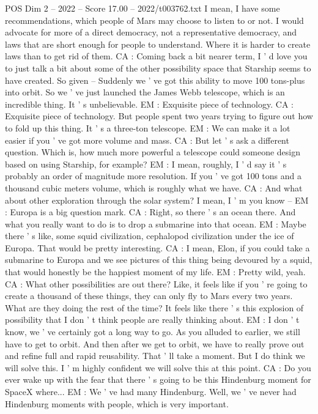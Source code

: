 \begin{textsample}{POS Dim 2 – 2022 – Score 17.00 – 2022/t003762.txt}
I mean, I have some recommendations, which people of Mars may choose to listen to or not.
I would advocate for more of a direct democracy, not a representative democracy, and laws that are short enough for people to understand.
Where it is harder to create laws than to get rid of them.
CA : Coming back a bit nearer term, I ' d love you to just talk a bit about some of the other possibility space that Starship seems to have created.
So given -- Suddenly we ' ve got this ability to move 100 tons-plus into orbit.
So we ' ve just launched the James Webb telescope, which is an incredible thing.
It ' s unbelievable.
EM : Exquisite piece of technology.
CA : Exquisite piece of technology.
But people spent two years trying to figure out how to fold up this thing.
It ' s a three-ton telescope.
EM : We can make it a lot easier if you ' ve got more volume and mass.
CA : But let ' s ask a different question.
Which is, how much more powerful a telescope could someone design based on using Starship, for example?
EM : I mean, roughly, I ' d say it ' s probably an order of magnitude more resolution.
If you ' ve got 100 tons and a thousand cubic meters volume, which is roughly what we have.
CA : And what about other exploration through the solar system?
I mean, I ' m you know -- EM : Europa is a big question mark.
CA : Right, so there ' s an ocean there.
And what you really want to do is to drop a submarine into that ocean.
EM : Maybe there ' s like, some squid civilization, cephalopod civilization under the ice of Europa.
That would be pretty interesting.
CA : I mean, Elon, if you could take a submarine to Europa and we see pictures of this thing being devoured by a squid, that would honestly be the happiest moment of my life.
EM : Pretty wild, yeah.
CA : What other possibilities are out there?
Like, it feels like if you ' re going to create a thousand of these things, they can only fly to Mars every two years.
What are they doing the rest of the time?
It feels like there ' s this explosion of possibility that I don ' t think people are really thinking about.
EM : I don ' t know, we ' ve certainly got a long way to go.
As you alluded to earlier, we still have to get to orbit.
And then after we get to orbit, we have to really prove out and refine full and rapid reusability.
That ' ll take a moment.
But I do think we will solve this.
I ' m highly confident we will solve this at this point.
CA : Do you ever wake up with the fear that there ' s going to be this Hindenburg moment for SpaceX where...
EM : We ' ve had many Hindenburg.
Well, we ' ve never had Hindenburg moments with people, which is very important.

\end{textsample}
